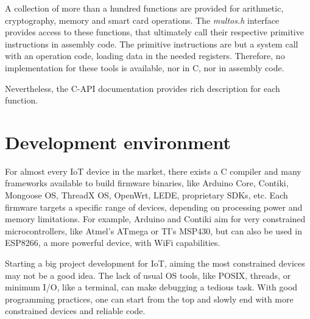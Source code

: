 A collection of more than a hundred functions are provided for arithmetic, cryptography, memory and smart card operations. The \textit{multos.h} interface provides access to these functions, that ultimately call their respective primitive instructions in assembly code. The primitive instructions are but a system call with an operation code, loading data in the needed registers. Therefore,  no implementation for these tools is available, nor in C, nor in assembly code.

Nevertheless, the C-API documentation \citep{MultosTechLib} provides rich description for each function.






\section{Development environment}


For almost every IoT device in the market, there exists a C compiler and many frameworks available to build firmware binaries, like Arduino Core, Contiki, Mongoose OS, ThreadX OS, OpenWrt, LEDE, proprietary SDKs, etc. Each firmware targets a specific range of devices, depending on processing power and memory limitations. For example, Arduino and Contiki aim for very constrained microcontrollers, like Atmel's ATmega or TI's MSP430, but can also be used in ESP8266, a more powerful device, with WiFi capabilities.

Starting a big project development for \ac{IoT}, aiming the most constrained devices may not be a good idea. The lack of usual OS tools, like POSIX, threads, or minimum I/O, like a terminal, can make debugging a tedious task. With good programming practices, one can start from the top and slowly end with more constrained devices and reliable code.


